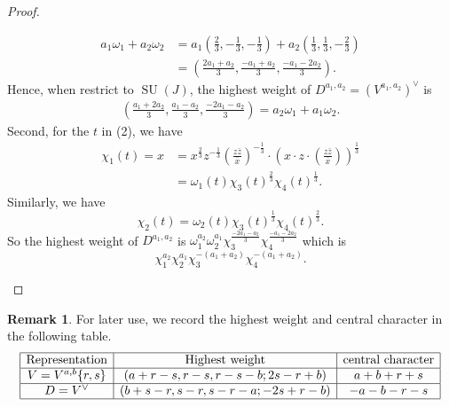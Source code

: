 \documentclass[11pt, a4paper]{amsart}
\theoremstyle{plain}
\theoremstyle{definition}
\newtheorem{remark}[theorem]{Remark}
\numberwithin{equation}{section}
\DeclareMathOperator{\SU}{\mathrm{SU}}
\begin{document}
\begin{proof}
\begin{enumerate}
            \begin{align*}
                a_1 \omega_1 + a_2 \omega_2 &= a_1 (\frac{2}{3}, -\frac{1}{3}, -\frac{1}{3}) + a_2 (\frac{1}{3}, \frac{1}{3}, -\frac{2}{3}) \\
                                            &= (\frac{2a_1 + a_2}{3}, \frac{-a_1 + a_2}{3}, \frac{-a_1 - 2a_2}{3}). 
            \end{align*}
            Hence, when restrict to $\SU(J)$, the highest weight of $D^{a_1, a_2} = (V^{a_1, a_2})^{\vee}$ is 
            \begin{align*}
                (\frac{a_1 + 2a_2}{3},  \frac{a_1 - a_2}{3},  \frac{-2a_1 - a_2}{3}) = a_2 \omega_1 + a_1 \omega_2. 
            \end{align*}
          Second, for the $t$ in (2), we have 
          \begin{align*}
              \chi_1(t) = x & = x^{\frac{2}{3}}z^{-\frac{1}{3}}(\frac{z\bar{z}}{\bar{x}})^{-\frac{1}{3}} \cdot (x \cdot z \cdot (\frac{z\bar{z}}{\bar{x}}))^{\frac{1}{3}} \\
                            & = \omega_1(t) \chi_3(t)^{\frac{2}{3}} \chi_4(t)^{\frac{1}{3}}.
          \end{align*}
          Similarly, we have 
          \begin{equation*}
              \chi_2(t) = \omega_2(t) \chi_3(t)^{\frac{1}{3}} \chi_4(t)^{\frac{2}{3}}. 
          \end{equation*}
          So the highest weight of $D^{a_1, a_2}$ is $\omega_1^{a_2}\omega_2^{a_1} \chi_3^{\frac{-2a_1 - a_2}{3}} \chi_4^{\frac{-a_1 - 2a_2}{3}}$ which is 
          \begin{equation*}
              \chi_1^{a_2} \chi_2^{a_1} \chi_3^{-(a_1 + a_2)} \chi_4^{-(a_1 + a_2)}. 
          \end{equation*}
  \end{enumerate}
\end{proof}
\begin{remark}
\label{remark: parameter of repn transform}
    For later use, we record the highest weight and central character in the following table. 
    \begin{equation}
        \begin{array}{|c|c|c|}
            \hline  \text{Representation}& \text{Highest weight} & \text{central character} \\
            \hline V = V^{a, b} \{r, s\} & (a + r - s, r - s, r - s - b; 2s - r + b) &  a + b + r + s\\
            \hline D = V^{\vee} & (b + s - r, s - r, s - r- a; -2s + r - b) & -a -b - r -s \\
            \hline 
            \end{array}
    \end{equation}
\end{remark}
\end{document}
